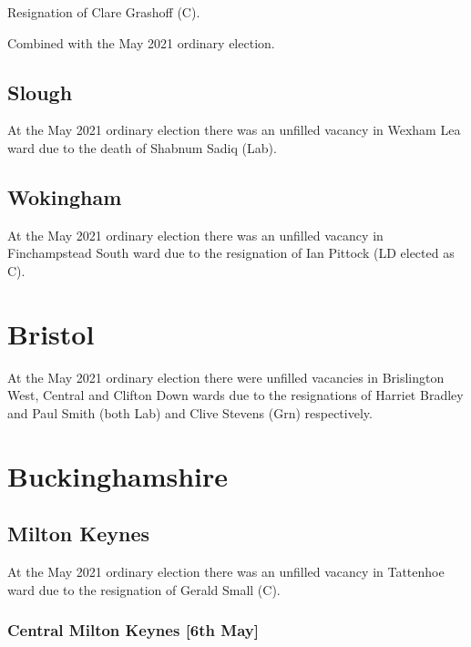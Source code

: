 \documentclass[a4paper,openany]{book}
\begin{document}
\begin{resultsiii}

Resignation of Clare Grashoff (C).

Combined with the May 2021 ordinary election.

\subsection*{Slough}

At the May 2021 ordinary election there was an unfilled vacancy in Wexham Lea ward due to the death of Shabnum Sadiq (Lab).

\subsection*{Wokingham}

At the May 2021 ordinary election there was an unfilled vacancy in Finchampstead South ward due to the resignation of Ian Pittock (LD elected as C).

\section{Bristol}

At the May 2021 ordinary election there were unfilled vacancies in Brislington West, Central and Clifton Down wards due to the resignations of Harriet Bradley and Paul Smith (both Lab) and Clive Stevens (Grn) respectively.

\section{Buckinghamshire}

\subsection*{Milton Keynes}

At the May 2021 ordinary election there was an unfilled vacancy in Tattenhoe ward due to the resignation of Gerald Small (C).

\subsubsection*{Central Milton Keynes \hspace*{\fill}\nolinebreak[1]%
	\enspace\hspace*{\fill}
	[6th May]}


\end{resultsiii}
\end{document}
